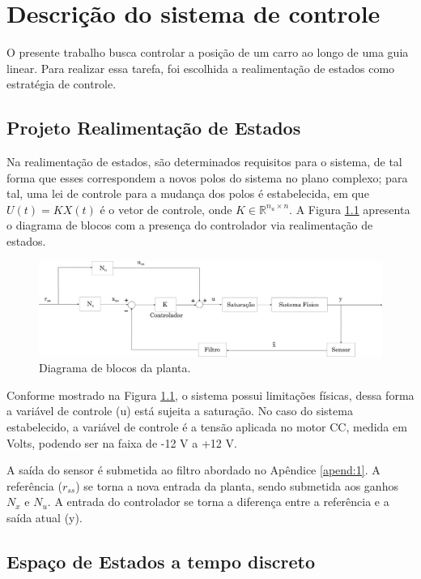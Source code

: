 \chapter{Descrição do sistema de controle}

O presente trabalho busca controlar a posição de um carro ao longo de uma guia linear. Para realizar essa tarefa, foi escolhida a realimentação de estados como estratégia de controle.

\section{Projeto Realimentação de Estados}

Na realimentação de estados, são determinados requisitos para o sistema, de tal forma que esses correspondem a novos polos do sistema no plano complexo; para tal, uma lei de controle para a mudança dos polos é estabelecida, em que $U(t) = KX(t)$ é o vetor de controle, onde $K \in \mathbb{R}^{n_u \times n}$. A Figura \ref{fig:diagrama_blocos} apresenta o diagrama de blocos com a presença do controlador via realimentação de estados.

\begin{figure}[H]
    \centering
    \includegraphics[width=1\linewidth]{figuras/diagrama_blocos.png}
    \caption[Diagrama de blocos da planta]{Diagrama de blocos da planta.}
    \label{fig:diagrama_blocos}
\end{figure}

Conforme mostrado na Figura \ref{fig:diagrama_blocos}, o sistema possui limitações físicas, dessa forma a variável de controle (u) está sujeita a saturação. No caso do sistema estabelecido, a variável de controle é a tensão aplicada no motor CC, medida em Volts, podendo ser na faixa de -12 V a +12 V.

A saída do sensor é submetida ao filtro abordado no Apêndice \ref{apend:1}. A referência ($r_{ss}$) se torna a nova entrada da planta, sendo submetida aos ganhos $N_x$ e $N_u$. A entrada do controlador se torna a diferença entre a referência e a saída atual (y).

\section{Espaço de Estados a tempo discreto}

